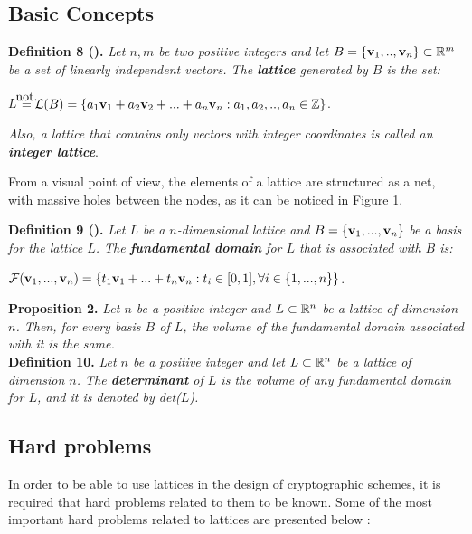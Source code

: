 \subsection{Basic Concepts}

\textbf{Definition 8 (\cite{HPS08}).} \textit{Let $n, m$ be two positive integers and let} $B = \{\textbf{v}_1, .., \textbf{v}_n\} \subset \mathbb{R}^m$ \textit{ be a set of linearly independent vectors. The \textbf{lattice} generated by $B$ is the set:}
\begin{center}
	$L$   $  \stackrel{\mathclap{\normalfont\mbox{not.}}}{=} \mathcal{L}(B) = \{a_1\vv_1 + a_2 \vv_2 +... + a_n\vv_n : a_1, a_2, ..,a_n \in \bZ\}$.
\end{center}

\textit{Also, a lattice that contains only vectors with integer coordinates is called an \textbf{integer lattice}}.

From a visual point of view, the elements of a lattice are structured as a net, with massive holes between the nodes, as it can be noticed in Figure 1.
\newpage

\textbf{Definition 9 (\cite{HPS08}).} \textit{Let $L$ be a $n$-dimensional lattice and} $B = \{\textbf{v}_1,...,\textbf{v}_n\}$ \textit{be a basis for the lattice $L$. The \textbf{fundamental domain} for $L$ that is associated with $B$ is:}
\begin{center}
	$\mathcal{F}(\textbf{v}_1,...,\textbf{v}_n) = \{t_1\textbf{v}_1 + ...+ t_n\textbf{v}_n : t_i \in [0, 1], \forall i \in \{1,..., n\}\}$.
\end{center}

\begin{center}
	
\end{center}

\textbf{Proposition 2.} \textit{Let $n$ be a positive integer and $L \subset \mathbb{R}^n$ be a lattice of dimension $n$. Then, for every basis $B$ of $L$, the volume of the fundamental domain associated with it is the same.}\\

\textbf{Definition 10.} \textit{Let $n$ be a positive integer and let $L \subset \mathbb{R}^n$ be a lattice of dimension $n$. The \textbf{determinant} of $L$ is the volume of any fundamental domain for $L$, and it is denoted by det($L$).}

\subsection{Hard problems}

In order to be able to use lattices in the design of cryptographic schemes, it is required that hard problems related to them to be known. Some of the most important hard problems related to lattices are presented below \cite{HPS08}:

